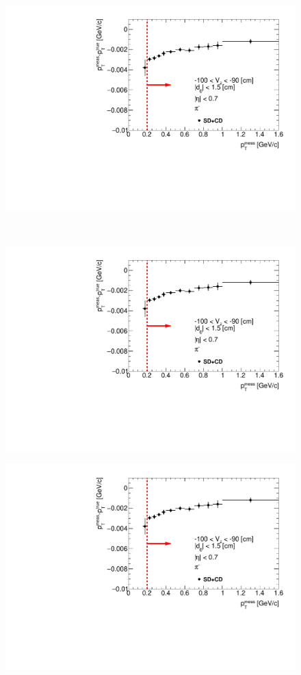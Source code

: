 \begin{figure}[H]\ContinuedFloat
\parbox{0.329\textwidth}{
  \includegraphics[width=\linewidth,page=35]{graphics/energyLoss/energyLoss3D_OnePrtAlso.pdf}\\
}~
\parbox{0.329\textwidth}{
  \includegraphics[width=\linewidth,page=36]{graphics/energyLoss/energyLoss3D_OnePrtAlso.pdf}\\
}%
\parbox{0.329\textwidth}{
  \includegraphics[width=\linewidth,page=37]{graphics/energyLoss/energyLoss3D_OnePrtAlso.pdf}\\
}%
\end{figure}
